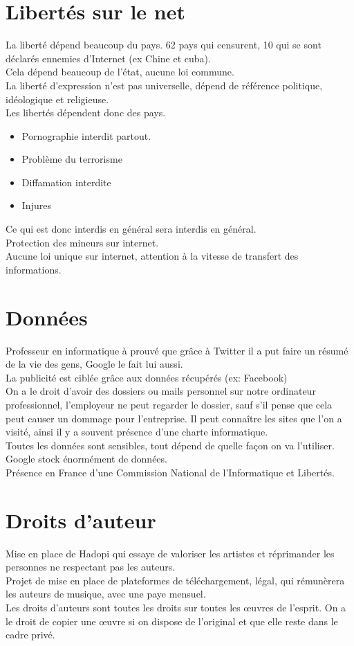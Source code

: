 \documentclass{article}
\begin{document}
	\section{Libertés sur le net}
		La liberté dépend beaucoup du pays. 62 pays qui censurent, 10 qui se sont
		déclarés ennemies d'Internet (ex Chine et cuba).\\
		Cela dépend beaucoup de l'état, aucune loi commune.\\
		La liberté d'expression n'est pas universelle, dépend de référence
		politique, idéologique et religieuse. \\
		Les libertés dépendent donc des pays. 
		\begin{itemize}
			\item Pornographie interdit partout. 	
			\item Problème du terrorisme
			\item Diffamation interdite
			\item Injures 
		\end{itemize}
		Ce qui est donc interdis en général sera interdis en général.\\
		Protection des mineurs sur internet.\\
		Aucune loi unique sur internet, attention à la vitesse de transfert
		des informations.
	\section{Données}
		Professeur en informatique à prouvé que grâce à Twitter il a put
		faire un résumé de la vie des gens, Google le fait lui aussi.\\
		La publicité est ciblée grâce aux données récupérés (ex: Facebook)\\
		On a le droit d'avoir des dossiers ou mails personnel sur notre ordinateur
		professionnel, l'employeur ne peut regarder le dossier, sauf s'il pense 
		que cela peut causer un dommage pour l'entreprise. Il peut connaître les 
		sites que l'on a visité, ainsi il y a souvent présence d'une charte 
		informatique. \\
		Toutes les données sont sensibles, tout dépend de quelle façon on va 
		l'utiliser.\\
		Google stock énormément de données.\\
		Présence en France d'une Commission National de l'Informatique et Libertés.\\
	\section{Droits d'auteur}
		Mise en place de Hadopi qui essaye de valoriser les artistes et 
		réprimander les personnes ne respectant pas les auteurs.\\
		Projet de mise en place de plateformes de téléchargement, légal, qui 
		rémunèrera les auteurs de musique, avec une paye mensuel.\\
		Les droits d'auteurs sont toutes les droits sur toutes les œuvres de 
		l'esprit. On a le droit de copier une œuvre si on dispose de l'original
		et que elle reste dans le cadre privé.
\end{document}
